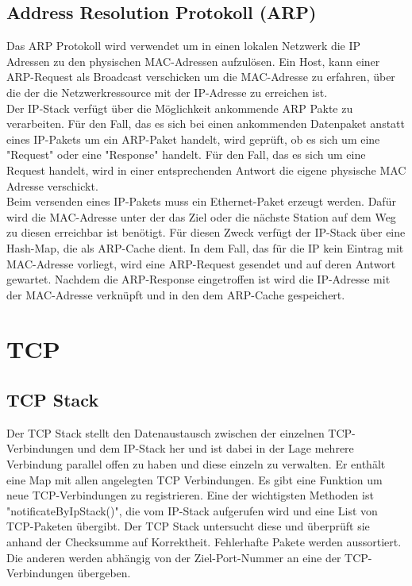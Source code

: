 \subsection{Address Resolution Protokoll (ARP)}
Das ARP Protokoll wird verwendet um in einen lokalen Netzwerk die IP Adressen zu den physischen MAC-Adressen aufzulösen. Ein Host, kann einer ARP-Request als Broadcast verschicken um die MAC-Adresse zu erfahren, über die der die Netzwerkressource mit der IP-Adresse zu erreichen ist. \\

Der IP-Stack verfügt über die Möglichkeit ankommende ARP Pakte zu verarbeiten. Für den Fall, das es sich bei einen ankommenden Datenpaket anstatt eines IP-Pakets um ein ARP-Paket handelt, wird geprüft, ob es sich um eine {}"Request"{} oder eine {}"Response"{} handelt. Für den Fall, das es sich um eine Request handelt, wird in einer entsprechenden Antwort die eigene physische MAC Adresse verschickt. \\

Beim versenden eines IP-Pakets muss ein Ethernet-Paket erzeugt werden. Dafür wird die MAC-Adresse unter der das Ziel oder die nächste Station auf dem Weg zu diesen erreichbar ist benötigt. Für diesen Zweck verfügt der IP-Stack über eine Hash-Map, die als ARP-Cache dient. In dem Fall, das für die IP kein Eintrag mit MAC-Adresse vorliegt, wird eine ARP-Request gesendet und auf deren Antwort gewartet. Nachdem die ARP-Response eingetroffen ist wird die IP-Adresse mit der MAC-Adresse verknüpft und in den dem ARP-Cache gespeichert. 






\section{TCP}

\subsection{TCP Stack}
Der TCP Stack stellt den Datenaustausch zwischen der einzelnen TCP-Verbindungen und dem IP-Stack her und ist dabei in der Lage mehrere Verbindung parallel offen zu haben und diese einzeln zu verwalten. 
Er enthält eine Map mit allen angelegten TCP Verbindungen. Es gibt eine Funktion um neue TCP-Verbindungen zu registrieren. Eine der wichtigsten Methoden ist "notificateByIpStack()", die vom IP-Stack aufgerufen wird und eine List von TCP-Paketen übergibt. Der TCP Stack untersucht diese und überprüft sie anhand der Checksumme auf Korrektheit. Fehlerhafte Pakete werden aussortiert. Die anderen werden abhängig von der Ziel-Port-Nummer an eine der TCP-Verbindungen übergeben.  

